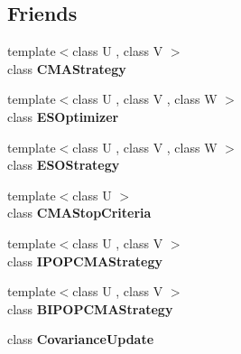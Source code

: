 \subsection*{Friends}
\begin{DoxyCompactItemize}
\item 
\hypertarget{classlibcmaes_1_1CMASolutions_a07488b7628d12135de0243eb796e53a9}{{\footnotesize template$<$class U , class V $>$ }\\class {\bfseries C\+M\+A\+Strategy}}\label{classlibcmaes_1_1CMASolutions_a07488b7628d12135de0243eb796e53a9}

\item 
\hypertarget{classlibcmaes_1_1CMASolutions_a8a4e3d4591e726bcf197f8d006c4ec76}{{\footnotesize template$<$class U , class V , class W $>$ }\\class {\bfseries E\+S\+Optimizer}}\label{classlibcmaes_1_1CMASolutions_a8a4e3d4591e726bcf197f8d006c4ec76}

\item 
\hypertarget{classlibcmaes_1_1CMASolutions_ad6ebfad69a17421ae398d90c542aea13}{{\footnotesize template$<$class U , class V , class W $>$ }\\class {\bfseries E\+S\+O\+Strategy}}\label{classlibcmaes_1_1CMASolutions_ad6ebfad69a17421ae398d90c542aea13}

\item 
\hypertarget{classlibcmaes_1_1CMASolutions_aff56187b22ef0b3164ed7711dc0c82c3}{{\footnotesize template$<$class U $>$ }\\class {\bfseries C\+M\+A\+Stop\+Criteria}}\label{classlibcmaes_1_1CMASolutions_aff56187b22ef0b3164ed7711dc0c82c3}

\item 
\hypertarget{classlibcmaes_1_1CMASolutions_a083272459c67810fd3e8b1702c7d67c2}{{\footnotesize template$<$class U , class V $>$ }\\class {\bfseries I\+P\+O\+P\+C\+M\+A\+Strategy}}\label{classlibcmaes_1_1CMASolutions_a083272459c67810fd3e8b1702c7d67c2}

\item 
\hypertarget{classlibcmaes_1_1CMASolutions_ae97315b6fb514c42e8c3973f362ef2a2}{{\footnotesize template$<$class U , class V $>$ }\\class {\bfseries B\+I\+P\+O\+P\+C\+M\+A\+Strategy}}\label{classlibcmaes_1_1CMASolutions_ae97315b6fb514c42e8c3973f362ef2a2}

\item 
\hypertarget{classlibcmaes_1_1CMASolutions_aa62543a4caa6d6b288bb58ca5411539c}{class {\bfseries Covariance\+Update}}\label{classlibcmaes_1_1CMASolutions_aa62543a4caa6d6b288bb58ca5411539c}


\end{DoxyCompactItemize}
